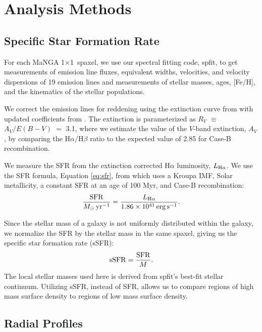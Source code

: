 \documentclass[iop,revtex4,twocolumn,apj,numberedappendix,appendixfloats]{emulateapj}
\begin{document}
\section{Analysis Methods}\label{sec:analysis}

\subsection{Specific Star Formation Rate}

For each MaNGA 1\arcsec$\times$1\arcsec\ spaxel, we use our spectral fitting code, {\sc spfit}, to get measurements of emission line fluxes, equivalent widths, velocities, and velocity dispersions of 19 emission lines and measurements of stellar masses, ages, [Fe/H], and the kinematics of the stellar populations. 

We correct the emission lines for reddening using the extinction curve from \citet{Cardelli:1989} with updated coefficients from \citet{ODonnell:1994}. The extinction is parameterized as $R_V$ $\equiv$ $A_V/E(B-V)$ $=$ 3.1, where we estimate the value of the $V$-band extinction, $A_V$, by comparing the H$\alpha$/H$\beta$ ratio to the expected value of 2.85 for Case-B recombination. 

We measure the SFR from the extinction corrected H$\alpha$ luminosity, $L_{{\rm H}\alpha}$.  We use the SFR formula, Equation \ref{eq:sfr}, from \citet{Murphy:2011} which uses a Kroupa IMF, Solar metallicity, a constant SFR at an age of 100 Myr, and Case-B recombination: 
\begin{equation}\label{eq:sfr}
\frac{\rm{SFR}}{M_{\odot} \, \rm{yr^{-1}}} = \frac{L_{\rm H\alpha}}{1.86 \times 10^{41}\, \rm{erg\,s}^{-1}}.
\end{equation}

Since the stellar mass of a galaxy is not uniformly distributed within the galaxy, we normalize the SFR by the stellar mass in the same spaxel, giving us the specific star formation rate (sSFR):
\begin{equation}
{\rm sSFR} = \frac{\rm SFR}{M}.
\end{equation}
The local stellar masses used here is derived from {\sc spfit}'s best-fit stellar continuum. Utilizing sSFR, instead of SFR, allows us to compare regions of high mass surface density to regions of low mass surface density. 

\subsection{Radial Profiles}\label{sec:radial}
\end{document}
